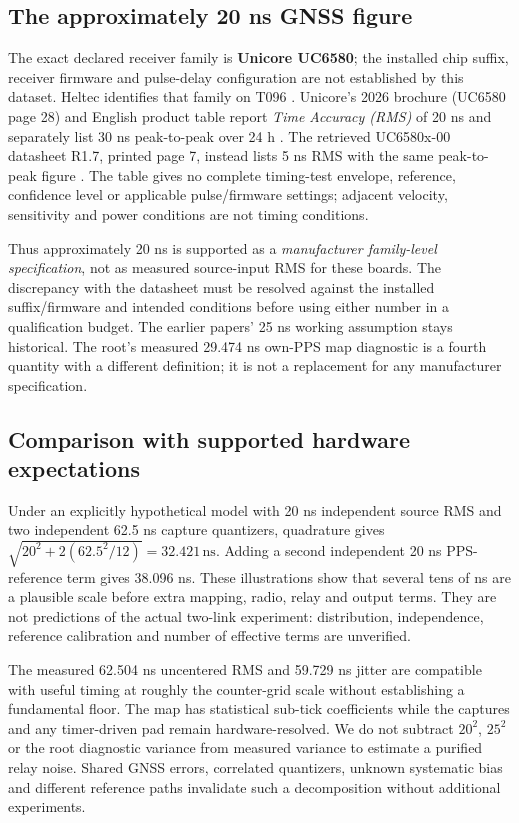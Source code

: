 \documentclass[11pt,letterpaper]{article}
\newcommand{\ns}{\,\mathrm{ns}}\newcommand{\us}{\,\mu\mathrm{s}}\newcommand{\ms}{\,\mathrm{ms}}\newcommand{\ppb}{\,\mathrm{ppb}}\newcommand{\code}[1]{\texttt{#1}}\newcolumntype{L}[1]{>{\RaggedRight\arraybackslash}p{#1}}
\begin{document}
\subsection{The approximately 20 ns GNSS figure}
The exact declared receiver family is \textbf{Unicore UC6580}; the installed chip suffix, receiver firmware and pulse-delay configuration are not established by this dataset. Heltec identifies that family on T096 \cite{heltec}. Unicore's 2026 brochure (UC6580 page 28) and English product table report \emph{Time Accuracy (RMS)} of 20 ns and separately list 30 ns peak-to-peak over 24 h \cite{ucbrochure,ucproduct}. The retrieved UC6580x-00 datasheet R1.7, printed page 7, instead lists 5 ns RMS with the same peak-to-peak figure \cite{ucdata}. The table gives no complete timing-test envelope, reference, confidence level or applicable pulse/firmware settings; adjacent velocity, sensitivity and power conditions are not timing conditions.

Thus approximately 20 ns is supported as a \emph{manufacturer family-level specification}, not as measured source-input RMS for these boards. The discrepancy with the datasheet must be resolved against the installed suffix/firmware and intended conditions before using either number in a qualification budget. The earlier papers' 25 ns working assumption stays historical. The root's measured 29.474 ns own-PPS map diagnostic is a fourth quantity with a different definition; it is not a replacement for any manufacturer specification.

\subsection{Comparison with supported hardware expectations}
Under an explicitly hypothetical model with 20 ns independent source RMS and two independent 62.5 ns capture quantizers, quadrature gives $\sqrt{20^2+2(62.5^2/12)}=32.421\ns$. Adding a second independent 20 ns PPS-reference term gives 38.096 ns. These illustrations show that several tens of ns are a plausible scale before extra mapping, radio, relay and output terms. They are not predictions of the actual two-link experiment: distribution, independence, reference calibration and number of effective terms are unverified.

The measured 62.504 ns uncentered RMS and 59.729 ns jitter are compatible with useful timing at roughly the counter-grid scale without establishing a fundamental floor. The map has statistical sub-tick coefficients while the captures and any timer-driven pad remain hardware-resolved. We do not subtract $20^2$, $25^2$ or the root diagnostic variance from measured variance to estimate a purified relay noise. Shared GNSS errors, correlated quantizers, unknown systematic bias and different reference paths invalidate such a decomposition without additional experiments.
\end{document}
